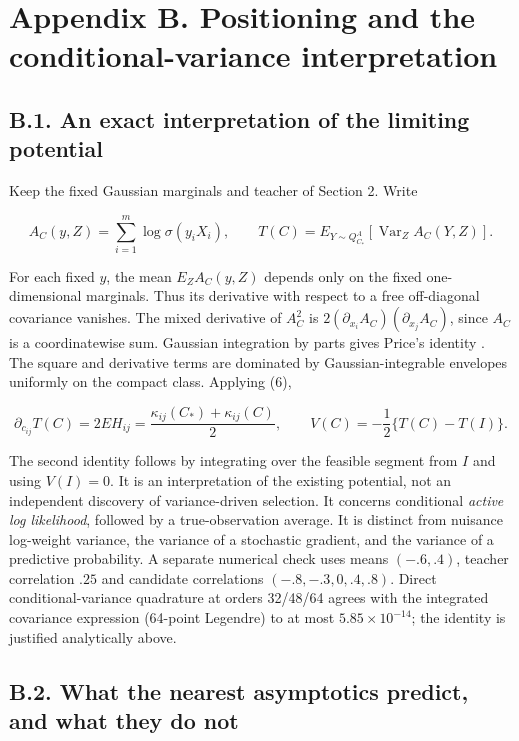 \documentclass{article}
\begin{document}
\clearpage

\section*{Appendix B. Positioning and the conditional-variance
interpretation}\label{appendix-b.-positioning-and-the-conditional-variance-interpretation}

\subsection*{B.1. An exact interpretation of the limiting
potential}\label{b.1.-an-exact-interpretation-of-the-limiting-potential}

Keep the fixed Gaussian marginals and teacher of Section 2. Write

\[
A_C(y,Z)=\sum_{i=1}^m\log\sigma(y_iX_i),\qquad
T(C)=E_{Y\sim Q_{C_*}^A}\!\left[\operatorname{Var}_Z A_C(Y,Z)\right].
\tag{B.1}
\]

For each fixed \(y\), the mean \(E_ZA_C(y,Z)\) depends only on the fixed
one-dimensional marginals. Thus its derivative with respect to a free
off-diagonal covariance vanishes. The mixed derivative of \(A_C^2\) is
\(2(\partial_{x_i}A_C)(\partial_{x_j}A_C)\), since \(A_C\) is a
coordinatewise sum. Gaussian integration by parts gives Price's identity
\citep{price1958}. The square and derivative terms are dominated by
Gaussian-integrable envelopes uniformly on the compact class. Applying
(6),

\[
\partial_{c_{ij}}T(C)=2EH_{ij}
=\frac{\kappa_{ij}(C_*)+\kappa_{ij}(C)}2,
\qquad V(C)=-\frac12\{T(C)-T(I)\}.
\tag{B.2}
\]

The second identity follows by integrating over the feasible segment
from \(I\) and using \(V(I)=0\). It is an interpretation of the existing
potential, not an independent discovery of variance-driven selection. It
concerns conditional \emph{active log likelihood}, followed by a
true-observation average. It is distinct from nuisance log-weight
variance, the variance of a stochastic gradient, and the variance of a
predictive probability. A separate numerical check uses means
\((-.6,.4)\), teacher correlation \(.25\) and candidate correlations
\((-.8,-.3,0,.4,.8)\). Direct conditional-variance quadrature at orders
32/48/64 agrees with the integrated covariance expression (64-point
Legendre) to at most \(5.85\times10^{-14}\); the identity is justified
analytically above.

\subsection*{B.2. What the nearest asymptotics predict, and what they do
not}\label{b.2.-what-the-nearest-asymptotics-predict-and-what-they-do-not}
\end{document}
